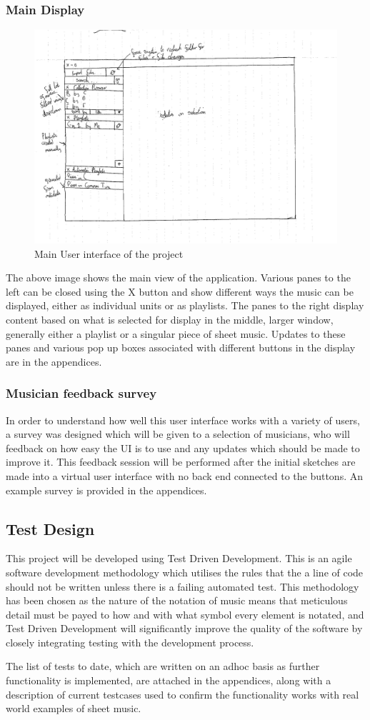 \subsubsection{Main Display}
\begin{figure}[h]
    \includegraphics[width=400pt]{main_view}
    \caption{Main User interface of the project}
\end{figure}
The above image shows the main view of the application. Various panes to the left can be closed using the X button and show different ways the music can be displayed, either as individual units or as playlists. The panes to the right display content based on what is selected for display in the middle, larger window, generally either a playlist or a singular piece of sheet music. Updates to these panes and various pop up boxes associated with different buttons in the display are in the appendices.
\subsubsection{Musician feedback survey}
In order to understand how well this user interface works with a variety of users, a survey was designed which will be given to a selection of musicians, who will feedback on how easy the UI is to use and any updates which should be made to improve it. This feedback session will be performed after the initial sketches are made into a virtual user interface with no back end connected to the buttons. An example survey is provided in the appendices.
\subsection{Test Design}
This project will be developed using Test Driven Development. This is an agile software development methodology which utilises the rules that the a line of code should not be written unless there is a failing automated test\parencite{TDD}. This methodology has been chosen as the nature of the notation of music means that meticulous detail must be payed to how and with what symbol every element is notated, and Test Driven Development will significantly improve the quality of the software by closely integrating testing with the development process.

The list of tests to date, which are written on an adhoc basis as further functionality is implemented, are attached in the appendices, along with a description of current testcases used to confirm the functionality works with real world examples of sheet music.